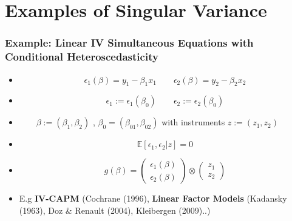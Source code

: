 \documentclass{beamer}
\begin{document}
\section{Examples of Singular Variance}




\begin{frame}
\frametitle{Example: Linear IV Simultaneous Equations with Conditional Heteroscedasticity}
\begin{itemize}
\item[] \begin{equation} \epsilon_{1}(\beta)= y_{1}-\beta_1 x_1 \qquad \epsilon_{2}(\beta)= y_{2}-\beta_2 x_2 \end{equation}
\item[] \begin{equation*} \epsilon_1:=\epsilon_1(\beta_0) \qquad \epsilon_2:=\epsilon_2(\beta_0)\end{equation*}
\item[]   $\qquad \beta:= ( \beta_1, \beta_2)$ , $\beta_0=(\beta_{01}, \beta_{02})$ with instruments $ z:=(z_{1}, z_{2})$

 \item[] \begin{equation} \mathbb{E}\left[\epsilon_{1},\epsilon_{2}| z\right]=0\end{equation}

\item[]\begin{equation}  g(\beta)= \left(\begin{array}{c} \epsilon_{1}(\beta) \\  \epsilon_{2}(\beta) \end{array}\right) \otimes \left(\begin{array}{c} z_1 \\ z_2 \end{array} \right)\end{equation}
\vspace{8pt}
\item[] E.g \textbf{IV-CAPM}  (Cochrane (1996), \textbf{Linear Factor Models} (Kadansky (1963), Doz \& Renault (2004), Kleibergen (2009)..)
\end{itemize}
\end{frame}
\end{document}

